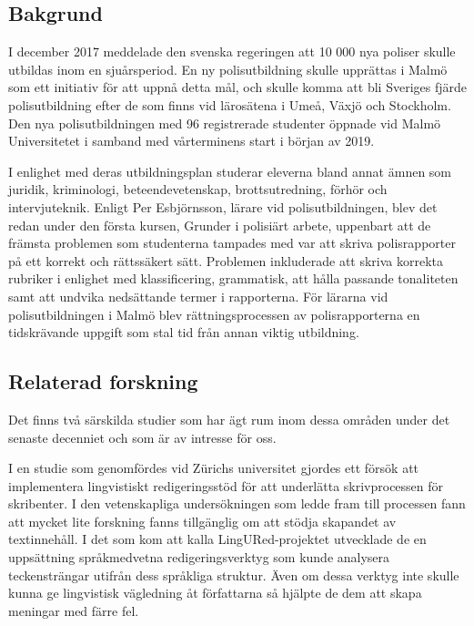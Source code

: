 \documentclass[swedish]{maucsthesis}
\begin{document}
\subsection{Bakgrund}
I december 2017 meddelade den svenska regeringen att 10 000 nya poliser skulle
utbildas inom en sjuårsperiod. En ny polisutbildning skulle upprättas i Malmö
som ett initiativ för att uppnå detta mål, och skulle komma att bli Sveriges
fjärde polisutbildning efter de som finns vid lärosätena i Umeå, Växjö och
Stockholm. Den nya polisutbildningen med 96 registrerade studenter öppnade vid
Malmö Universitetet i samband med vårterminens start i början av 2019.

I enlighet med deras utbildningsplan studerar eleverna bland annat ämnen som
juridik, kriminologi, beteendevetenskap, brottsutredning, förhör och
intervjuteknik. Enligt Per Esbjörnsson, lärare vid polisutbildningen, blev det
redan under den första kursen, Grunder i polisiärt arbete, uppenbart att de
främsta problemen som studenterna tampades med var att skriva polisrapporter på
ett korrekt och rättssäkert sätt. Problemen inkluderade att skriva korrekta
rubriker i enlighet med klassificering, grammatisk, att hålla passande
tonaliteten samt att undvika nedsättande termer i rapporterna. För lärarna vid
polisutbildningen i Malmö blev rättningsprocessen av polisrapporterna en
tidskrävande uppgift som stal tid från annan viktig utbildning.

\subsection{Relaterad forskning}

Det finns två särskilda studier som har ägt rum inom dessa områden under det
senaste decenniet och som är av intresse för oss.

I en studie som genomfördes vid Zürichs universitet gjordes ett försök att
implementera lingvistiskt redigeringsstöd för att underlätta skrivprocessen för
skribenter. I den vetenskapliga undersökningen som ledde fram till processen
fann \cite{Piotrowski:2009} att mycket lite forskning fanns tillgänglig om att
stödja skapandet av textinnehåll. I det som \citeauthor{Piotrowski:2009} kom att
kalla LingURed-projektet utvecklade de en uppsättning språkmedvetna
redigeringsverktyg som kunde analysera teckensträngar utifrån dess språkliga
struktur. Även om dessa verktyg inte skulle kunna ge lingvistisk vägledning åt
författarna så hjälpte de dem att skapa meningar med färre fel.
\end{document}
